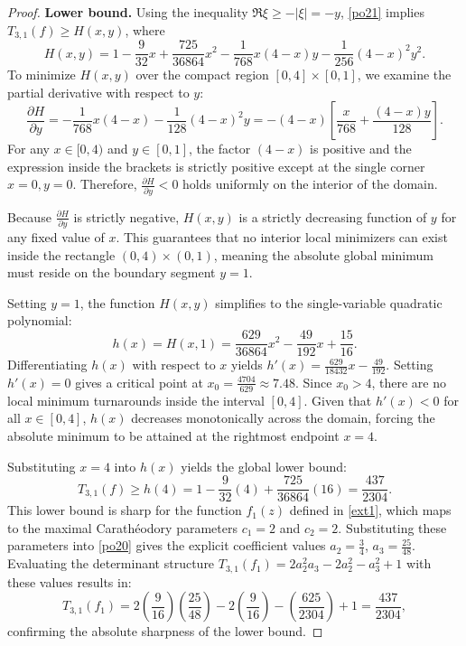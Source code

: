 \documentclass[11pt]{article}
\numberwithin{equation}{section}
\begin{document}
\begin{proof}
\medskip
\noindent\textbf{Lower bound.}
Using the inequality $\Re\xi \ge -|\xi| = -y$, \eqref{po21} implies $T_{3,1}(f) \ge H(x,y)$, where
\[
H(x,y) = 1 - \frac{9}{32}x + \frac{725}{36864}x^2 - \frac{1}{768}x(4-x)y - \frac{1}{256}(4-x)^2y^2.
\]
To minimize $H(x,y)$ over the compact region $[0,4] \times [0,1]$, we examine the partial derivative with respect to $y$:
\[
\frac{\partial H}{\partial y} = -\frac{1}{768}x(4-x) - \frac{1}{128}(4-x)^2y = -(4-x)\left[ \frac{x}{768} + \frac{(4-x)y}{128} \right].
\]
For any $x \in [0,4)$ and $y \in [0,1]$, the factor $(4-x)$ is positive and the expression inside the brackets is strictly positive except at the single corner $x=0, y=0$. Therefore, $\frac{\partial H}{\partial y} < 0$ holds uniformly on the interior of the domain. 

Because $\frac{\partial H}{\partial y}$ is strictly negative, $H(x,y)$ is a strictly decreasing function of $y$ for any fixed value of $x$. This guarantees that no interior local minimizers can exist inside the rectangle $(0,4) \times (0,1)$, meaning the absolute global minimum must reside on the boundary segment $y = 1$.

Setting $y = 1$, the function $H(x,y)$ simplifies to the single-variable quadratic polynomial:
\[
h(x) = H(x,1) = \frac{629}{36864}x^2 - \frac{49}{192}x + \frac{15}{16}.
\]
Differentiating $h(x)$ with respect to $x$ yields $h'(x) = \frac{629}{18432}x - \frac{49}{192}$. Setting $h'(x) = 0$ gives a critical point at $x_0 = \frac{4704}{629} \approx 7.48$. Since $x_0 > 4$, there are no local minimum turnarounds inside the interval $[0,4]$. Given that $h'(x) < 0$ for all $x \in [0,4]$, $h(x)$ decreases monotonically across the domain, forcing the absolute minimum to be attained at the rightmost endpoint $x = 4$.

Substituting $x = 4$ into $h(x)$ yields the global lower bound:
\[
T_{3,1}(f) \ge h(4) = 1 - \frac{9}{32}(4) + \frac{725}{36864}(16) = \frac{437}{2304}.
\]
This lower bound is sharp for the function $f_1(z)$ defined in \eqref{ext1}, which maps to the maximal Carath\'{e}odory parameters $c_1=2$ and $c_2=2$. Substituting these parameters into \eqref{po20} gives the explicit coefficient values $a_2 = \frac{3}{4}$, $a_3 = \frac{25}{48}$. Evaluating the determinant structure $T_{3,1}(f_1) = 2 a_2^2 a_3 - 2 a_2^2 - a_3^2 + 1$ with these values results in:
\[
T_{3,1}(f_1) = 2\left(\frac{9}{16}\right)\left(\frac{25}{48}\right) - 2\left(\frac{9}{16}\right) - \left(\frac{625}{2304}\right) + 1 = \frac{437}{2304},
\]
confirming the absolute sharpness of the lower bound.
\end{proof}
\end{document}
